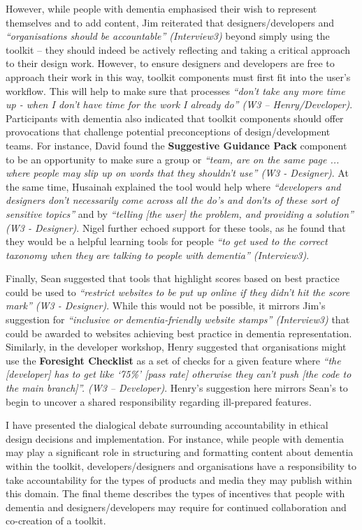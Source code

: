 However, while people with dementia emphasised their wish to represent themselves and to add content, Jim reiterated that designers/developers and \textit{``organisations should be accountable'' (Interview3)} beyond simply using the toolkit – they should indeed be actively reflecting and taking a critical approach to their design work. However, to ensure designers and developers are free to approach their work in this way, toolkit components must first fit into the user's workflow. This will help to make sure that processes \textit{``don't take any more time up - when I don't have time for the work I already do'' (W3 – Henry/Developer)}. Participants with dementia also indicated that toolkit components should offer provocations that challenge potential preconceptions of design/development teams. For instance, David found the \textbf{Suggestive Guidance Pack }component to be an opportunity to make sure a group or \textit{``team, are on the same page ... where people may slip up on words that they shouldn't use'' (W3 - Designer)}. At the same time, Husainah explained the tool would help where \textit{``developers and designers don't necessarily come across all the do's and don'ts of these sort of sensitive topics''} and by \textit{``telling [the user] the problem, and providing a solution'' (W3 - Designer)}. Nigel further echoed support for these tools, as he found that they would be a helpful learning tools for people \textit{``to get used to the correct taxonomy when they are talking to people with dementia'' (Interview3)}. 

Finally, Sean suggested that tools that highlight scores based on best practice could be used to \textit{``restrict websites to be put up online if they didn't hit the score mark'' (W3 - Designer)}. While this would not be possible, it mirrors Jim's suggestion for \textit{``inclusive or dementia-friendly website stamps'' (Interview3)} that could be awarded to websites achieving best practice in dementia representation. Similarly, in the developer workshop, Henry suggested that organisations might use the \textbf{Foresight Checklist} as a set of checks for a given feature where\textit{ ``the [developer] has to get like ‘75\%’ [pass rate] otherwise they can’t push [the code to the main branch]''. (W3 – Developer)}. Henry’s suggestion here mirrors Sean’s to begin to uncover a shared responsibility regarding ill-prepared features.

I have presented the dialogical debate surrounding accountability in ethical design decisions and implementation. For instance, while people with dementia may play a significant role in structuring and formatting content about dementia within the toolkit, developers/designers and organisations have a responsibility to take accountability for the types of products and media they may publish within this domain. The final theme describes the types of incentives that people with dementia and designers/developers may require for continued collaboration and co-creation of a toolkit.

